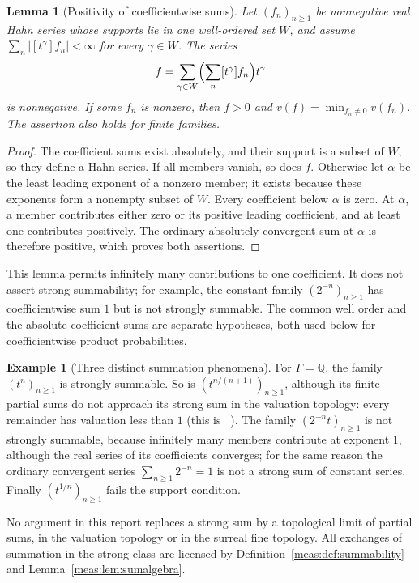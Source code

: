 \documentclass[11pt]{article}
\numberwithin{equation}{section}
\newtheorem{lemma}[theorem]{Lemma}
\theoremstyle{definition}
\newtheorem{example}[theorem]{Example}
\theoremstyle{remark}
\newcommand{\Q}{\mathbb Q}
\newcommand{\coef}[2]{[t^{#1}]#2}
\newcommand{\abs}[1]{\lvert#1\rvert}
\begin{document}
\begin{lemma}[Positivity of coefficientwise sums]\label{meas:lem:coefpositive}
Let $(f_n)_{n\ge1}$ be nonnegative real Hahn series whose supports lie in
one well-ordered set $W$, and assume
$\sum_n\abs{\coef{\gamma}{f_n}}<\infty$ for every $\gamma\in W$.
The series
\[
 f=\sum_{\gamma\in W}\Bigl(\sum_n\coef{\gamma}{f_n}\Bigr)t^\gamma
\]
is nonnegative. If some $f_n$ is nonzero, then $f>0$ and
$v(f)=\min_{f_n\ne0}v(f_n)$. The assertion also holds for finite families.
\end{lemma}
\begin{proof}
The coefficient sums exist absolutely, and their support is a subset of $W$,
so they define a Hahn series. If all members vanish, so does $f$. Otherwise
let $\alpha$ be the least leading exponent of a nonzero member; it exists
because these exponents form a nonempty subset of $W$. Every coefficient
below $\alpha$ is zero. At $\alpha$, a member contributes either zero or
its positive leading coefficient, and at least one contributes positively.
The ordinary absolutely convergent sum at $\alpha$ is therefore positive,
which proves both assertions.
\end{proof}

This lemma permits infinitely many contributions to one coefficient.
It does not assert strong summability; for example, the constant family
$(2^{-n})_{n\ge1}$ has coefficientwise sum $1$ but is not strongly summable.
The common well order and the absolute coefficient sums are separate
hypotheses, both used below for coefficientwise product probabilities.

\begin{example}[Three distinct summation phenomena]\label{meas:ex:sums}
For $\Gamma=\Q$, the family $(t^n)_{n\ge1}$ is strongly summable. So is
$(t^{n/(n+1)})_{n\ge1}$, although its finite partial sums do not approach its
strong sum in the valuation topology: every remainder has valuation less than
$1$ (this is ~\cite{repofound}). The family
$(2^{-n}t)_{n\ge1}$ is not strongly summable, because infinitely many members
contribute at exponent $1$, although the real series of its coefficients
converges; for the same reason the ordinary convergent series
$\sum_{n\ge1}2^{-n}=1$ is not a strong sum of constant series. Finally
$(t^{1/n})_{n\ge1}$ fails the support condition.
\end{example}

No argument in this report replaces a strong sum by a topological limit of
partial sums, in the valuation topology or in the surreal fine topology. All
exchanges of summation in the strong class are licensed by
Definition~\ref{meas:def:summability} and Lemma~\ref{meas:lem:sumalgebra}.
\end{document}
